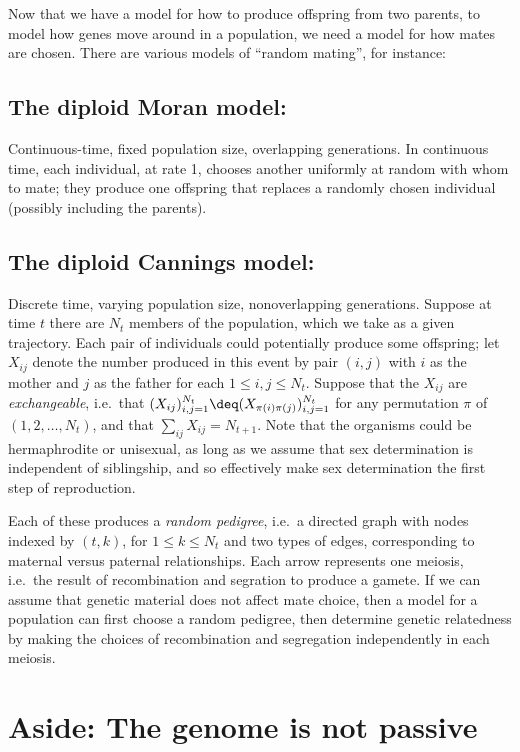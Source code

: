Now that we have a model for how to produce offspring from two parents,
to model how genes move around in a population,
we need a model for how mates are chosen.
There are various models of ``random mating'',
for instance:

\subsection{The diploid Moran model:}
Continuous-time, fixed population size, overlapping generations.
In continuous time, each individual, at rate 1, chooses another uniformly at random
with whom to mate;
they produce one offspring
that replaces a randomly chosen individual (possibly including the parents).

\subsection{The diploid Cannings model:}
Discrete time, varying population size, nonoverlapping generations.
Suppose at time $t$ there are $N_t$ members of the population,
which we take as a given trajectory.
Each pair of individuals could potentially produce some offspring;
let $X_{ij}$ denote the number produced in this event by pair $(i,j)$ with $i$ as the mother and $j$ as the father for each $1 \le i,j \le N_{t}$.
Suppose that the $X_{ij}$ are \emph{exchangeable},
i.e.\ that $(X_{ij})_{i,j=1}^{N_{t}} \deq (X_{\pi(i)\pi(j)})_{i,j=1}^{N_{t}}$ for any permutation $\pi$ of $(1,2,\ldots,N_{t})$,
and that $\sum_{ij} X_{ij} = N_{t+1}$.
Note that the organisms could be hermaphrodite or unisexual,
as long as we assume that sex determination is independent of siblingship,
and so effectively make sex determination the first step of reproduction.


Each of these produces a \emph{random pedigree}, 
i.e.\ a directed graph with nodes indexed by $(t,k)$, for $1 \le k \le N_t$
and two types of edges, corresponding to maternal versus paternal relationships.
Each arrow represents one meiosis, i.e.\ the result of recombination and segration to produce a gamete.
If we can assume that genetic material does not affect mate choice,
then a model for a population can first choose a random pedigree,
then determine genetic relatedness by making the choices of recombination and segregation
independently in each meiosis.



\section*{Aside: The genome is not passive}

